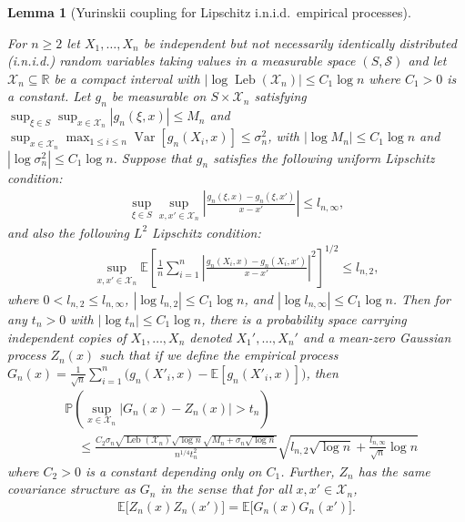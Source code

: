 \documentclass[11pt,lof]{puthesis}
\renewcommand{\P}{\ensuremath{\mathbb{P}}}
\newcommand{\R}{\ensuremath{\mathbb{R}}}
\newcommand{\E}{\ensuremath{\mathbb{E}}}
\newcommand{\cX}{\ensuremath{\mathcal{X}}}
\newcommand{\cS}{\ensuremath{\mathcal{S}}}
\DeclareMathOperator{\Var}{Var}
\DeclareMathOperator{\Leb}{Leb}
\theoremstyle{break}
\newtheorem{lemma}{Lemma}[section]
\theoremstyle{proof}
\begin{document}
\begin{lemma}[Yurinskii coupling for Lipschitz i.n.i.d.\ empirical processes]
  \label{lem:kernel_app_yurinskii_corollary}

  For $n \geq 2$ let $X_1, \dots, X_n$
  be independent but not necessarily identically distributed
  (i.n.i.d.) random variables
  taking values in a measurable space $(S, \cS)$
  and let $\cX_n \subseteq \R$
  be a compact interval
  with $\left|\log \Leb(\cX_n)\right| \leq C_1 \log n$
  where $C_1 > 0$ is a constant.
  Let $g_n$ be measurable on $S \times \cX_n$ satisfying
  $\sup_{\xi \in S} \sup_{x \in \cX_n} |g_n(\xi, x)| \leq M_n$
  and
  $\sup_{x \in \cX_n} \max_{1 \leq i \leq n} \Var[g_n(X_i, x)]
  \leq \sigma_n^2$,
  with $\left|\log M_n\right| \leq C_1 \log n$
  and $\left|\log \sigma_n^2\right| \leq C_1 \log n$.
  Suppose that $g_n$ satisfies the following uniform
  Lipschitz condition:
  \begin{align*}
    \sup_{\xi \in S}
    \sup_{x,x' \in \cX_n}
    \left|
      \frac{g_n(\xi, x) - g_n(\xi, x')}
      {x-x'}
    \right|
    \leq
    l_{n,\infty},
  \end{align*}
  and also the following $L^2$
  Lipschitz condition:
  \begin{align*}
    \sup_{x,x' \in \cX_n}
    \E\left[
      \frac{1}{n}
      \sum_{i=1}^n
      \left|
        \frac{g_n(X_i, x) - g_n(X_i, x')}
        {x-x'}
      \right|^2
    \right]^{1/2}
    \leq
    l_{n,2},
  \end{align*}
  where $0 < l_{n,2} \leq l_{n,\infty}$,
  $\left|\log l_{n,2}\right| \leq C_1 \log n$, and
  $\left|\log l_{n,\infty}\right| \leq C_1 \log n$.
  Then for any $t_n > 0$ with
  $\left|\log t_n\right| \leq C_1 \log n$,
  there is a probability space carrying
  independent copies of $X_1, \ldots, X_n$ denoted $X_1', \ldots, X_n'$
  and a mean-zero Gaussian process $Z_n(x)$
  such that if we define the empirical process
  $G_n(x) = \frac{1}{\sqrt n} \sum_{i=1}^n
  \big( g_n(X'_i,x) - \E[g_n(X'_i,x)] \big)$,
  then
  \begin{align*}
    &\P\left(
      \sup_{x \in \cX_n}
      \big|
      G_n(x) - Z_n(x)
      \big|
      > t_n
    \right) \\
    &\quad\leq
    \frac{
      C_2
      \sigma_n
      \sqrt{\Leb(\cX_n)}
      \sqrt{\log n}
      \sqrt{M_n + \sigma_n\sqrt{\log n}}
    }{n^{1/4} t_n^2}
    \sqrt{
      l_{n,2}
      \sqrt{\log n}
      + \frac{l_{n,\infty}}{\sqrt n}
    \log n}
  \end{align*}
  where $C_2 > 0$ is a constant depending only on $C_1$.
  Further, $Z_n$
  has the same covariance structure as $G_n$
  in the sense that for all $x, x' \in \cX_n$,
  \begin{align*}
    \E\big[Z_n(x) Z_n(x')\big]
    = \E\big[G_n(x) G_n(x')\big].
  \end{align*}

\end{lemma}
\end{document}
